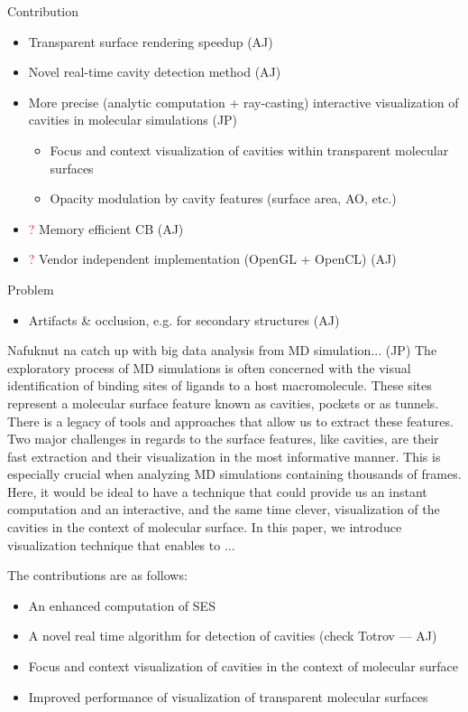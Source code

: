Contribution
\begin{itemize}
  \item Transparent surface rendering speedup (AJ)
	\item Novel real-time cavity detection method (AJ)
	\item More precise (analytic computation + ray-casting) interactive visualization of cavities in molecular simulations (JP)
	\begin{itemize}
		\item Focus and context visualization of cavities within transparent molecular surfaces
		\item Opacity modulation by cavity features (surface area, AO, etc.)
	\end{itemize}
	\item \textcolor{red}{?} Memory efficient CB (AJ)
	\item \textcolor{red}{?} Vendor independent implementation (OpenGL + OpenCL) (AJ)
\end{itemize}

Problem
\begin{itemize}
  \item Artifacts \& occlusion, e.g. for secondary structures (AJ)
\end{itemize}

Nafuknut na catch up with big data analysis from MD simulation... (JP)
The exploratory process of MD simulations is often concerned with the visual identification of binding sites of ligands to a host macromolecule.
These sites represent a molecular surface feature known as cavities, pockets or as tunnels.
There is a legacy of tools and approaches that allow us to extract these features.
Two major challenges in regards to the surface features, like cavities, are their fast extraction and their visualization in the most informative manner.
This is especially crucial when analyzing MD simulations containing thousands of frames.
Here, it would be ideal to have a technique that could provide us an instant computation and an interactive, and the same time clever, visualization of the cavities in the context of molecular surface.
In this paper, we introduce visualization technique that enables to ...

The contributions are as follows:
\begin{itemize}
  \item An enhanced computation of SES
  \item A novel real time algorithm for detection of cavities (check Totrov --- AJ)
  \item Focus and context visualization of cavities in the context of molecular surface
  \item Improved performance of visualization of transparent molecular surfaces
\end{itemize}
